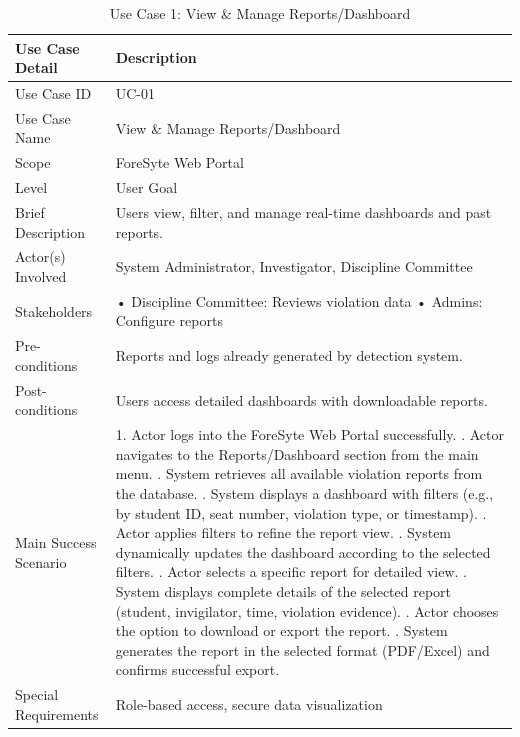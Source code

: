 \begin{longtable}{|p{5cm}|p{10cm}|}
\caption{Use Case 1: View \& Manage Reports/Dashboard} \label{uc1} \\

\hline
\textbf{Use Case Detail} & \textbf{Description} \\ \hline
Use Case ID & UC-01 \\ \hline
Use Case Name & View \& Manage Reports/Dashboard \\ \hline
Scope & ForeSyte Web Portal \\ \hline
Level & User Goal \\ \hline
Brief Description & Users view, filter, and manage real-time dashboards and past reports. \\ \hline
Actor(s) Involved & System Administrator, Investigator, Discipline Committee \\ \hline
Stakeholders & • Discipline Committee: Reviews violation data \newline • Admins: Configure reports \\ \hline
Pre-conditions & Reports and logs already generated by detection system. \\ \hline
Post-conditions & Users access detailed dashboards with downloadable reports. \\ \hline
Main Success Scenario & 
1. Actor logs into the ForeSyte Web Portal successfully. \newline
2. Actor navigates to the Reports/Dashboard section from the main menu. \newline
3. System retrieves all available violation reports from the database. \newline
4. System displays a dashboard with filters (e.g., by student ID, seat number, violation type, or timestamp). \newline
5. Actor applies filters to refine the report view. \newline
6. System dynamically updates the dashboard according to the selected filters. \newline
7. Actor selects a specific report for detailed view. \newline
8. System displays complete details of the selected report (student, invigilator, time, violation evidence). \newline
9. Actor chooses the option to download or export the report. \newline
10. System generates the report in the selected format (PDF/Excel) and confirms successful export. \\ \hline

Special Requirements & Role-based access, secure data visualization \\ \hline

\end{longtable}

